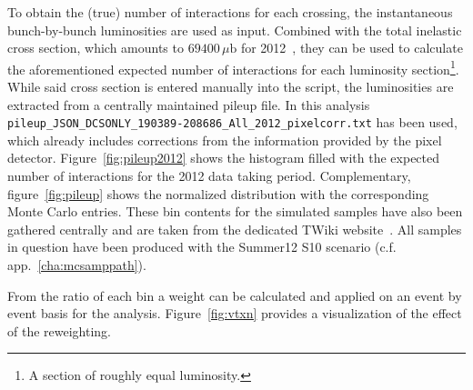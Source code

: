 To obtain the (true) number of interactions for each crossing, the instantaneous bunch-by-bunch luminosities are used as input. Combined with the total inelastic cross section, which amounts to $69400\,\mu\text{b}$ for 2012~\cite{pileup}, they can be used to calculate the aforementioned expected number of interactions for each  luminosity section\footnote{A section of roughly equal luminosity.}. While said cross section is entered manually into the script, the luminosities are extracted from a centrally maintained pileup file. In this analysis \verb+pileup_JSON_DCSONLY_190389-208686_All_2012_pixelcorr.txt+ has been used, which already includes corrections from the information provided by the pixel detector. Figure~\ref{fig:pileup2012} shows the histogram filled with the expected number of interactions for the 2012 data taking period. Complementary, figure~\ref{fig:pileup} shows the normalized distribution with the corresponding Monte Carlo entries. These bin contents for the simulated samples have also been gathered centrally and are taken from the dedicated TWiki website~\cite{pileupmc}. All samples in question have been produced with the Summer12 S10 scenario (c.f. app.~\ref{cha:mcsamppath}).

From the ratio of each bin a weight can be calculated and applied on an event by event basis for the analysis. Figure~\ref{fig:vtxn} provides a visualization of the effect of the reweighting.

